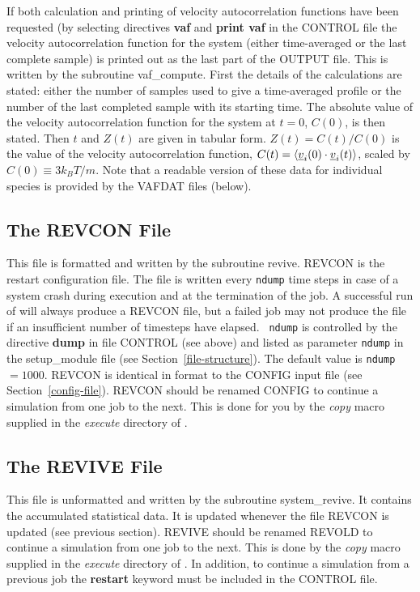 If both calculation and printing of velocity autocorrelation functions
have been requested (by selecting directives {\bf vaf} and {\bf print vaf}
in the CONTROL file the velocity autocorrelation function for the system
(either time-averaged or the last complete sample) is printed out as the
last part of the OUTPUT file.  This is written by the subroutine
{\sc vaf\_compute}.  First the details of the calculations are stated:
either the number of samples used to give a time-averaged profile
or the number of the last completed sample with its starting time.
The absolute value of the velocity autocorrelation function for the system
at $t=0$, $C(0)$, is then stated. Then $t$ and $Z(t)$ are given in tabular form.
$Z(t)=C(t)/C(0)$ is the value of the velocity autocorrelation function,
$C(t)=\langle \mbox{$\underline{v}$}_{i}(0) \cdot  \mbox{$\underline{v}$}_{i}(t) \rangle$,
scaled by $C(0) \equiv 3k_B T/m$.  Note that a readable version of these data
for individual species is provided by the VAFDAT files (below).

\subsection{The REVCON File}
\label{revcon-file}

This file is formatted and written by the subroutine {\sc revive}.
REVCON is the restart configuration file.  The file is written every
{\tt ndump} time steps in case of a system crash during execution
and at the termination of the job.  A successful run of \D will
always produce a REVCON file, but a failed job may not produce the
file if an insufficient number of timesteps have elapsed.  {\tt
ndump} is controlled by the directive {\bf dump} in file CONTROL
(see above) and listed as parameter {\tt ndump} in the {\sc
setup\_module} file (see Section~\ref{file-structure}). The default
value is {\tt ndump} $=1000$.  REVCON is identical in format to the
CONFIG input file (see Section~\ref{config-file}).  REVCON should be
renamed CONFIG to continue a simulation from one job to the next.
This is done for you by the {\sl copy} macro supplied in the {\em
execute} directory of \D.

\subsection{The REVIVE File}
\label{revive-file}

This file is unformatted and written by the subroutine {\sc
system\_revive}.  It contains the accumulated statistical data. It
is updated whenever the file REVCON is updated (see previous
section).  REVIVE should be renamed REVOLD to continue a
simulation from one job to the next.  This is done by the {\sl
copy} macro supplied in the {\em execute} directory of \D.  In
addition, to continue a simulation from a previous job the {\bf
restart} keyword must be included in the CONTROL file.

